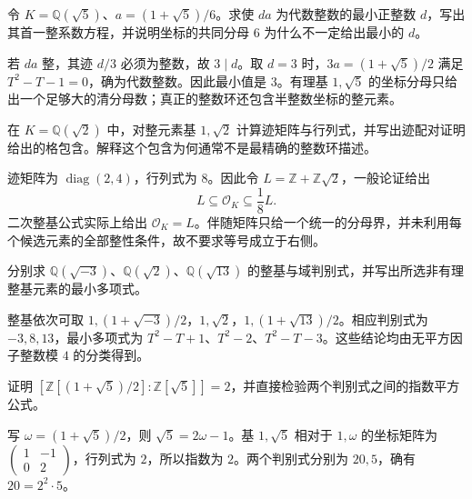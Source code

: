 \BookExercises

\begin{exercise}\label{b3:ex:A-clear-denominator}
	令 \(K=\mathbb Q(\sqrt5)\)、\(a=(1+\sqrt5)/6\)。求使 \(da\) 为代数整数的最小正整数 \(d\)，写出其首一整系数方程，并说明坐标的共同分母 \(6\) 为什么不一定给出最小的 \(d\)。
\end{exercise}
\begin{solution}
	若 \(da\) 整，其迹 \(d/3\) 必须为整数，故 \(3\mid d\)。取 \(d=3\) 时，\(3a=(1+\sqrt5)/2\) 满足 \(T^2-T-1=0\)，确为代数整数。因此最小值是 \(3\)。有理基 \(1,\sqrt5\) 的坐标分母只给出一个足够大的清分母数；真正的整数环还包含半整数坐标的整元素。
\end{solution}

\begin{exercise}\label{b3:ex:A-trace-bound}
	在 \(K=\mathbb Q(\sqrt2)\) 中，对整元素基 \(1,\sqrt2\) 计算迹矩阵与行列式，并写出迹配对证明给出的格包含。解释这个包含为何通常不是最精确的整数环描述。
\end{exercise}
\begin{solution}
	迹矩阵为 \(\operatorname{diag}(2,4)\)，行列式为 \(8\)。因此令 \(L=\mathbb Z+\mathbb Z\sqrt2\)，一般论证给出
	\[
		L\subseteq\mathcal O_K\subseteq\dfrac18L.
	\]
	二次整基公式实际上给出 \(\mathcal O_K=L\)。伴随矩阵只给一个统一的分母界，并未利用每个候选元素的全部整性条件，故不要求等号成立于右侧。
\end{solution}

\begin{exercise}\label{b3:ex:A-quadratic-bases}
	分别求 \(\mathbb Q(\sqrt{-3})\)、\(\mathbb Q(\sqrt2)\)、\(\mathbb Q(\sqrt{13})\) 的整基与域判别式，并写出所选非有理整基元素的最小多项式。
\end{exercise}
\begin{solution}
	整基依次可取 \(1,(1+\sqrt{-3})/2\)，\(1,\sqrt2\)，\(1,(1+\sqrt{13})/2\)。相应判别式为 \(-3,8,13\)，最小多项式为 \(T^2-T+1\)、\(T^2-2\)、\(T^2-T-3\)。这些结论均由无平方因子整数模 \(4\) 的分类得到。
\end{solution}

\begin{exercise}\label{b3:ex:A-index-discriminant}
	证明 \([\mathbb Z[(1+\sqrt5)/2]:\mathbb Z[\sqrt5]]=2\)，并直接检验两个判别式之间的指数平方公式。
\end{exercise}
\begin{solution}
	写 \(\omega=(1+\sqrt5)/2\)，则 \(\sqrt5=2\omega-1\)。基 \(1,\sqrt5\) 相对于 \(1,\omega\) 的坐标矩阵为
	\(\left(\begin{smallmatrix}1&-1\\0&2\end{smallmatrix}\right)\)，行列式为 \(2\)，所以指数为 \(2\)。两个判别式分别为 \(20,5\)，确有 \(20=2^2\cdot5\)。
\end{solution}

